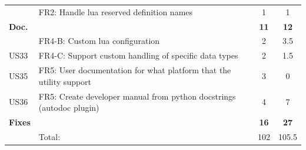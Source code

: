 \begin{table}[!htb]
\begin{tabularx}{\textwidth}{l X c c}
	 & FR2: Handle \Gls{lua} reserved definition names & 1 & 1 \\
	\addlinespace
	\textbf{Doc.} &  & \textbf{11} & \textbf{12} \\
	 & FR4-B: Custom \Gls{lua} configuration & 2 & 3.5\\
	US33 & FR4-C: Support custom handling of specific data types & 2 & 1.5 \\
	US35 & FR5: User documentation for what platform that the \gls{utility} support & 3 & 0 \\
	US36 & FR5: Create developer manual from \Gls{python} docstrings (autodoc plugin) & 4 & 7 \\
	\addlinespace
	\textbf{Fixes} &  & \textbf{16} & \textbf{27} \\
	\midrule
	& Total: & 102 &  105.5\\
	\bottomrule
\end{tabularx}
\end{table}

